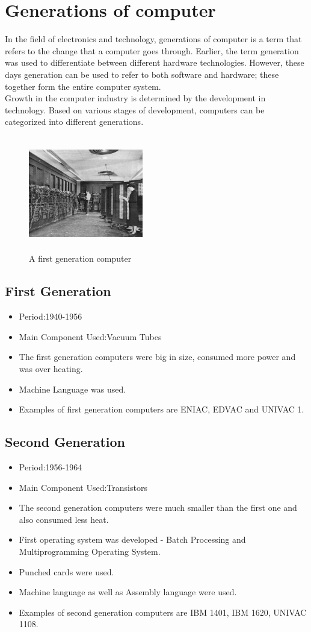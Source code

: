 \documentclass[11pt,a4paper,twoside]{article}
\begin{document}
\section{Generations of computer}
In the field of electronics and technology, generations of computer is a term that refers to the change that a computer goes through. Earlier, the term generation was used to differentiate between different hardware technologies. However, these days generation can be used to refer to both software and hardware; these together form the entire computer system.\\
\indent Growth in the computer industry is determined by the development in technology. Based on various stages of development, computers can be categorized into different generations.\\
\begin{figure}
\includegraphics[width=5cm,height=5cm]{Fig 2.jpg}
\caption{A first generation computer}
\end{figure}
\subsection{First Generation}
\begin{itemize}
\item Period:1940-1956
\item Main Component Used:Vacuum Tubes
\item The first generation computers were big in size, consumed more power and was over heating.
\item Machine Language was used.
\item Examples of first generation computers are ENIAC, EDVAC and UNIVAC 1.
\end{itemize}
\subsection{Second Generation}
\begin{itemize}
    \item Period:1956-1964
    \item Main Component Used:Transistors
    \item The second generation computers were much smaller than the first one and also consumed less heat.
    \item First operating system was developed - Batch Processing and Multiprogramming Operating System.
    \item Punched cards were used.
    \item Machine language as well as Assembly language were used.  
    \item Examples of second generation computers are IBM 1401, IBM 1620, UNIVAC 1108.
\end{itemize}
\end{document}
